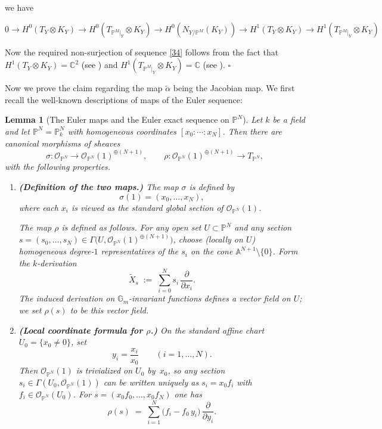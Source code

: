 \documentclass[11pt,twoside]{amsart}
\theoremstyle{plain}
\numberwithin{equation}{section}
\newtheorem{lemma}[theorem]{Lemma}
\theoremstyle{definition}
\newcommand*{\QEDB}{\hfill\ensuremath{\square}}
\newcommand{\PP}{\mathbb{P}}
\newcommand{\OO}{\mathcal{O}}
\newcommand{\Gm}{\mathbb{G}_m}
\begin{document}
we have 

$$0 \to H^0(T_Y \otimes K_Y) \to H^0(T_{\mathbb{P}^M|_Y} \otimes K_Y) \to H^0(N_{Y/\mathbb{P}^M}(K_Y)) \to H^1(T_Y \otimes K_Y) \to H^1(T_{\mathbb{P}^M|_Y} \otimes K_Y)$$

Now the required non-surjection of sequence \ref{34} follows from the fact that $H^1(T_Y \otimes K_Y) = \mathbb{C}^2$ \textcolor{black}{(see \cite[Lemma $2.5$, $(4)$]{BMR21})} and $H^1(T_{\mathbb{P}^M|_Y} \otimes K_Y) = \mathbb{C}$ \textcolor{black}{(see \cite[Lemma $2.5$, ($(3)$)]{BMR21})}. \QEDB

\color{black}

Now we prove the claim regarding the map $\widetilde{\alpha}$ being the Jacobian map.  We first recall the well-known descriptions of maps of the Euler sequence:

\begin{lemma}[The Euler maps and the Euler exact sequence on $\PP^N$]\label{lem:Euler-sequence-maps}
Let $k$ be a field and let $\PP^N=\PP^N_k$ with homogeneous coordinates
$[x_0:\cdots:x_N]$.  Then there are canonical morphisms of sheaves
\[
\sigma:\OO_{\PP^N}\longrightarrow \OO_{\PP^N}(1)^{\oplus (N+1)},
\qquad
\rho:\OO_{\PP^N}(1)^{\oplus (N+1)}\longrightarrow T_{\PP^N},
\]
with the following properties.

\begin{enumerate}
\item[\textup{(i)}] \textbf{(Definition of the two maps.)}
The map $\sigma$ is defined by
\[
\sigma(1)=(x_0,\dots,x_N),
\]
where each $x_i$ is viewed as the standard global section of $\OO_{\PP^N}(1)$.

The map $\rho$ is defined as follows.  For any open set $U\subset \PP^N$ and
any section $s=(s_0,\dots,s_N)\in \Gamma\!\big(U,\OO_{\PP^N}(1)^{\oplus(N+1)}\big)$,
choose (locally on $U$) homogeneous degree-$1$ representatives of the $s_i$ on the
cone $\mathbb{A}^{N+1}\setminus\{0\}$.  Form the $k$-derivation
\[
\widetilde{X}_s \;:=\; \sum_{i=0}^N s_i\,\frac{\partial}{\partial x_i}.
\]
The induced derivation on $\Gm$-invariant functions defines a vector field on $U$;
we set $\rho(s)$ to be this vector field.


\item[\textup{(ii)}] \textbf{(Local coordinate formula for $\rho$.)}
On the standard affine chart $U_0=\{x_0\neq 0\}$, set
\[
y_i=\frac{x_i}{x_0}\qquad (i=1,\dots,N).
\]
Then $\OO_{\PP^N}(1)$ is trivialized on $U_0$ by~$x_0$, so any section
$s_i\in \Gamma(U_0,\OO_{\PP^N}(1))$ can be written uniquely as $s_i=x_0 f_i$ with
$f_i\in \OO_{\PP^N}(U_0)$.  For $s=(x_0 f_0,\dots,x_0 f_N)$ one has
\begin{equation}\label{eq:local-formula}
\rho(s)
\;=\;
\sum_{i=1}^N \bigl(f_i-f_0\,y_i\bigr)\,\frac{\partial}{\partial y_i}.
\end{equation}


\end{enumerate}
\end{lemma}
\end{document}
